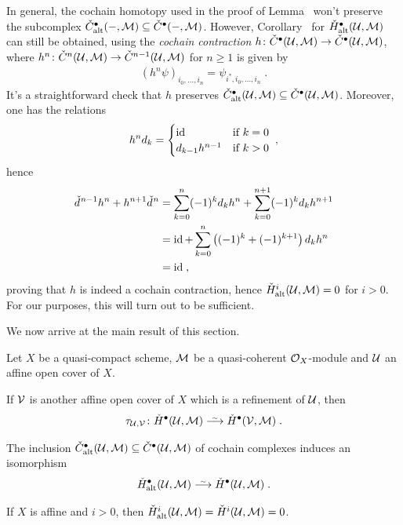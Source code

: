 \documentclass[a4paper,parskip=half,numbers=enddot, DIV=12]{scrreprt}
\renewcommand{\geq}{\geqslant}
\begin{document}
\begin{rem}
	In general, the cochain homotopy used in the proof of Lemma~ won't preserve the subcomplex $\check{C}_{\mathrm{alt}}^\bullet (-,\mathcal{M})\subseteq\check{C}^\bullet (-,\mathcal{M})$. However, Corollary~ for $\check{H}_{\mathrm{alt}}^\bullet (\mathcal{U},\mathcal{M})$ can still be obtained, using the \emph{cochain contraction} $h\colon \check{C}^\bullet (\Uu,\Mm)\morphism\check{C}^\bullet (\Uu,\Mm)$, where $h^n\colon \check{C}^n(\Uu,\Mm)\morphism\check{C}^{n-1}(\Uu,\Mm)$ for $n\geq 1$ is given by
	\begin{align*}
		(h^n\psi)_{i_0,\ldots,i_n}=\psi_{i^*,i_0,\ldots,i_n}\;.
	\end{align*}
	It's a straightforward check that $h$ preserves $\check{C}_{\mathrm{alt}}^\bullet (\mathcal{U},\mathcal{M})\subseteq \check{C}^\bullet (\mathcal{U},\mathcal{M})$. Moreover, one has the relations
	\begin{align*}
		h^nd_k=\begin{cases}
			\operatorname{id} &\text{if }k=0\\
			d_{k-1}h^{n-1} & \text{if }k>0
		\end{cases}\;,
	\end{align*}
	hence
	\begin{align*}
		\check{d}\hspace{0.06125em}^{n-1}h^n+h^{n+1}\check{d}\hspace{0.06125em}^n&=\sum_{k=0}^{n}(-1)^kd_kh^n+\sum_{k=0}^{n+1}(-1)^kd_kh^{n+1}\\
		&=\operatorname{id}+\sum_{k=0}^{n}\left((-1)^k+(-1)^{k+1}\right)d_kh^n\\
		&=\operatorname{id}\;,
	\end{align*}
	proving that $h$ is indeed a cochain contraction, hence $\check{H}_{\mathrm{alt}}^i(\mathcal{U},\mathcal{M})=0$ for $i>0$. For our purposes, this will turn out to be sufficient.
\end{rem}
We now arrive at the main result of this section.
\begin{prop}
	 Let $X$ be a quasi-compact scheme, $\mathcal{M}$ be a quasi-coherent $\mathcal{O}_X$-module and $\mathcal{U}$ an affine open cover of $X$.
	\begin{alphanumerate}
		\item If $\mathcal{V}$ is another affine open cover of $X$ which is a refinement of $\mathcal{U}$, then
		\begin{align*}
			\tau_{\Uu,\Vv}\colon \check{H}^\bullet (\Uu,\Mm)\isomorphism\check{H}^\bullet (\Vv,\Mm)\;.
		\end{align*}
		\item The inclusion $\check{C}_{\mathrm{alt}}^\bullet (\mathcal{U},\mathcal{M})\subseteq \check{C}^\bullet (\mathcal{U},\mathcal{M})$ of cochain complexes induces an isomorphism
		\begin{align*}
			\check{H}_\alt^\bullet (\Uu,\Mm)\isomorphism\check{H}^\bullet (\Uu,\Mm)\;.
		\end{align*}
		\item If $X$ is affine and $i>0$, then $\check{H}_{\mathrm{alt}}^i(\mathcal{U},\mathcal{M})=\check{H}^i(\mathcal{U},\mathcal{M})=0$.
	\end{alphanumerate}
\end{prop}
\end{document}
